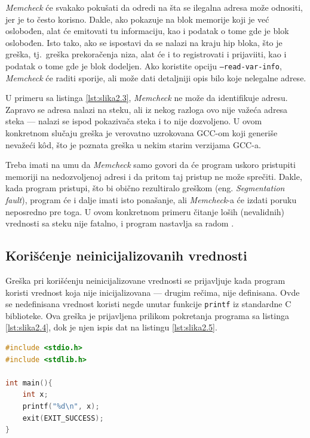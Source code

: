 \documentclass[12pt,oneside]{memoir}
\theoremstyle{plain}
\theoremstyle{definition}
\begin{document}
\textit{Memcheck} će svakako pokušati da odredi na šta se ilegalna adresa može odnositi, jer je to često korisno. Dakle, ako pokazuje na blok memorije koji je već oslobođen, alat će emitovati tu informaciju, kao i podatak o tome gde je blok oslobođen. Isto tako, ako se ispostavi da se nalazi na kraju hip bloka, što je greška, tj.~greška prekoračenja niza, alat će i to registrovati i prijaviiti, kao i podatak o tome gde je blok dodeljen. Ako koristite opciju \texttt{--read-var-info}, \textit{Memcheck} će raditi sporije, ali može dati detaljniji opis bilo koje nelegalne adrese.

U primeru sa listinga \ref{lst:slika2.3}, \textit{Memcheck} ne može da identifikuje adresu. Zapravo se adresa nalazi na steku, ali iz nekog razloga ovo nije važeća adresa steka --- nalazi se ispod pokazivača steka i to nije dozvoljeno. U ovom konkretnom slučaju greška je verovatno uzrokovana GCC-om koji generiše nevažeći k\^od, što je poznata greška u nekim starim verzijama GCC-a.

Treba imati na umu da \textit{Memcheck} samo govori da će program uskoro pristupiti memoriji na nedozvoljenoj adresi i da pritom taj pristup ne može sprečiti. Dakle, kada program pristupi, što bi obično rezultiralo greškom (eng. \textit{Segmentation fault}), program će i dalje imati isto ponašanje, ali \textit{Memcheck}-a će izdati poruku neposredno pre toga. U ovom konkretnom primeru čitanje loših (nevalidnih) vrednosti sa steku nije fatalno, i program nastavlja sa radom \cite{Memcheck}. 

\subsection{Korišćenje neinicijalizovanih vrednosti}
Greška pri korišćenju neinicijalizovane vrednosti se prijavljuje kada program koristi vrednost koja nije inicijalizovana --- drugim rečima, nije definisana. Ovde se nedefinisana vrednost koristi negde unutar funkcije \texttt{printf} iz standardne C biblioteke. Ova greška je prijavljena prilikom pokretanja programa sa listinga \ref{lst:slika2.4}, dok je njen ispis dat na listingu \ref{lst:slika2.5}.

\begin{lstlisting}[style=mystyle,caption={Program koji izaziva grešku korišćenja neinicijalizovanih vrednosti}, label={lst:slika2.4},language={C}] 
#include <stdio.h>
#include <stdlib.h>

int main(){
	int x;
	printf("%d\n", x);
	exit(EXIT_SUCCESS);
}
\end{lstlisting}
\end{document}

